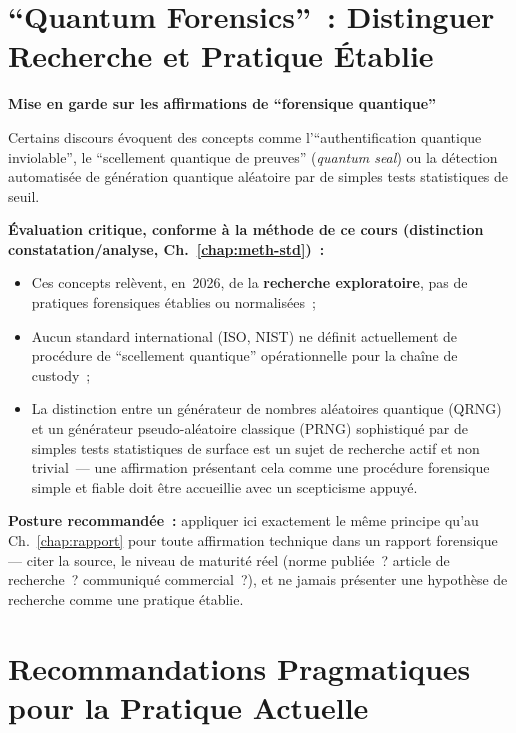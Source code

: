 \section{``Quantum Forensics''~: Distinguer Recherche et Pratique Établie}
\label{sec:quantum-forensics-critique}

\begin{boxalert}
\textbf{Mise en garde sur les affirmations de ``forensique quantique''}

Certains discours évoquent des concepts comme l'``authentification
quantique inviolable'', le ``scellement quantique de preuves''
(\textit{quantum seal}) ou la détection automatisée de génération
quantique aléatoire par de simples tests statistiques de seuil.

\textbf{Évaluation critique, conforme à la méthode de ce cours
(distinction constatation/analyse, Ch.~\ref{chap:meth-std})~:}
\begin{itemize}
    \item Ces concepts relèvent, en~2026, de la \textbf{recherche
          exploratoire}, pas de pratiques forensiques établies
          ou normalisées~;
    \item Aucun standard international (ISO, NIST) ne définit
          actuellement de procédure de ``scellement quantique''
          opérationnelle pour la chaîne de custody~;
    \item La distinction entre un générateur de nombres aléatoires
          quantique (QRNG) et un générateur pseudo-aléatoire
          classique (PRNG) sophistiqué par de simples tests
          statistiques de surface est un sujet de recherche actif
          et non trivial~--- une affirmation présentant cela comme
          une procédure forensique simple et fiable doit être
          accueillie avec un scepticisme appuyé.
\end{itemize}
\textbf{Posture recommandée~:} appliquer ici exactement le même
principe qu'au Ch.~\ref{chap:rapport} pour toute affirmation
technique dans un rapport forensique --- citer la source, le
niveau de maturité réel (norme publiée~? article de recherche~?
communiqué commercial~?), et ne jamais présenter une hypothèse
de recherche comme une pratique établie.
\end{boxalert}

\section{Recommandations Pragmatiques pour la Pratique Actuelle}
\label{sec:recommandations-pratiques}


